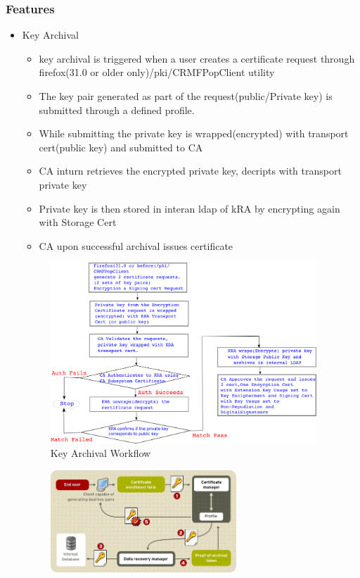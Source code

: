 \documentclass[12pt]{report}
\begin{document}
\subsubsection{Features}
\begin{itemize}
    \item Key Archival
        \begin{itemize}
            \item key archival is triggered when a user creates a certificate request through
                firefox(31.0 or older only)/pki/CRMFPopClient utility
            \item The key pair generated as part of the request(public/Private key) is submitted
                through a defined profile. 
            \item While submitting the private key is wrapped(encrypted) with transport cert(public key)
                and submitted to CA
            \item CA inturn retrieves the encrypted private key, decripts with transport private key 
            \item Private key is then stored in interan ldap of kRA by encrypting again with Storage Cert
            \item CA upon successful archival issues certificate
        \end{itemize}
        \begin{figure}[H]
            \centering
            \includegraphics[width=100mm]{Images/key-archival2.png}
            \caption{Key Archival Workflow}
        \end{figure}
        \begin{figure}[H]
            \centering
            \includegraphics[width=70mm]{Images/key-archival-process.png}

\end{figure}
\end{itemize}
\end{document}
